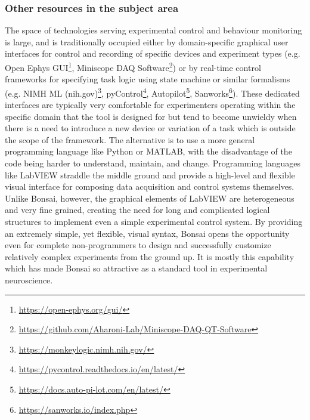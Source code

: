 \subsubsection*{Other resources in the subject area}

The space of technologies serving experimental control and behaviour monitoring
is large, and is traditionally occupied either by domain-specific graphical
user interfaces for control and recording of specific devices and experiment
types (e.g. Open Ephys
GUI\footnote{\href{https://open-ephys.org/gui/}{https://open-ephys.org/gui/}},
Miniscope DAQ
Software\footnote{\href{https://github.com/Aharoni-Lab/Miniscope-DAQ-QT-Software}{https://github.com/Aharoni-Lab/Miniscope-DAQ-QT-Software}})
or by real-time control frameworks for specifying task logic using state
machine or similar formalisms (e.g. NIMH ML
(nih.gov)\footnote{\href{https://monkeylogic.nimh.nih.gov/}{https://monkeylogic.nimh.nih.gov/}},
pyControl\footnote{\href{https://pycontrol.readthedocs.io/en/latest/}{https://pycontrol.readthedocs.io/en/latest/}},
Autopilot\footnote{\href{https://docs.auto-pi-lot.com/en/latest/}{https://docs.auto-pi-lot.com/en/latest/}},
Sanworks\footnote{\href{https://sanworks.io/index.php}{https://sanworks.io/index.php}}).
These dedicated interfaces are typically very comfortable for experimenters
operating within the specific domain that the tool is designed for but tend to
become unwieldy when there is a need to introduce a new device or variation of
a task which is outside the scope of the framework. The alternative is to use a
more general programming language like Python or MATLAB, with the disadvantage
of the code being harder to understand, maintain, and change. Programming
languages like LabVIEW straddle the middle ground and provide a high-level and
flexible visual interface for composing data acquisition and control systems
themselves. Unlike Bonsai, however, the graphical elements of LabVIEW are
heterogeneous and very fine grained, creating the need for long and complicated
logical structures to implement even a simple experimental control system. By
providing an extremely simple, yet flexible, visual syntax, Bonsai opens the
opportunity even for complete non-programmers to design and successfully
customize relatively complex experiments from the ground up. It is mostly this
capability which has made Bonsai so attractive as a standard tool in
experimental neuroscience.


